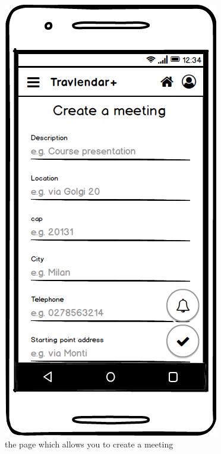 \documentclass[11pt]{article}
\begin{document}
	\begin{figure}
		\centering
		\includegraphics[width=0.7\linewidth]{CreateMeeting.png}
		\caption{the page which allows you to create a meeting}
		\label{fig:createmeeting}
	\end{figure}
\end{document}
